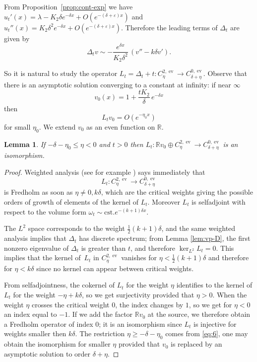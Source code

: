 \documentclass[10pt]{amsart}
\let\epsilon\varepsilon
\theoremstyle{plain}
\newtheorem{lem}[thm]{Lemma}
\theoremstyle{definition}
\DeclareMathOperator{\ev}{ev}
\begin{document}
From Proposition~\ref{prop:cont-exp} we have
$u_t'(x)=\lambda-K_2\delta e^{-\delta x}+O(e^{-(\delta+\epsilon)x})$ and
$u_t''(x)=K_2\delta^2e^{-\delta x}+O(e^{-(\delta+\epsilon)x})$. Therefore the leading terms of $\Delta_t$ are given by
\[ \Delta_tv \sim -\frac{e^{\delta x}}{K_2\delta^2}\, ( v'' - k\delta v'). \]

So it is natural to study the operator $L_t=\Delta_t+t:C^{2,\ev}_\eta\to C^{0,\ev}_{\delta+\eta}$. Observe that there is an asymptotic solution converging to a constant at infinity: if near $\infty$
\begin{equation}
v_0(x) = 1 + \frac{tK_2}{\delta}\, e^{-\delta x}
\end{equation}
then
\begin{equation}
L_tv_0=O(e^{-\eta_0 x})\label{eq:6}
\end{equation}
for small $\eta_0$.
We extend $v_0$ as an even function on $\mathbb{R}$.

\begin{lem}\label{lem:L-iso}
If $-\delta-\eta_0\leq\eta<0$ and $t>0$ then $L_t:\mathbb{R}v_0 \oplus C^{2,\ev}_\eta\to C^{0,\ev}_{\delta+\eta}$ is an isomorphism.
\end{lem}
\begin{proof}
Weighted analysis (see for example \cite{LocMcO}) says immediately that \[L_t:C^{2,\ev}_\eta\to C^{0,\ev}_{\delta+\eta}\] is Fredholm as soon as $\eta\neq0, k\delta$, which are the critical weights giving the possible orders of growth of elements of the kernel of $L_t$. Moreover $L_t$ is selfadjoint with respect to the volume form $\omega_t\sim \mathrm{cst.} e^{-(k+1)\delta x}$.

The $L^2$ space corresponds to the weight $\frac12 (k+1)\delta$, and the same weighted analysis implies that $\Delta_t$ has discrete spectrum; from Lemma \ref{lem:vp-D}, the first nonzero eigenvalue of $\Delta_t$ is greater than $t$, and therefore $\ker_{L^2}L_t=0$. This implies that the kernel of~$L_t$ in $C^{2,\ev}_\eta$ vanishes for $\eta<\frac12 (k+1)\delta$ and therefore for $\eta<k\delta$ since no kernel can appear between critical weights.

From selfadjointness, the cokernel of $L_t$ for the weight $\eta$ identifies to the kernel of $L_t$ for the weight $-\eta+k\delta$, so we get surjectivity provided that $\eta>0$. When the weight $\eta$ crosses the critical weight $0$, the index changes by $1$, so we get for $\eta<0$ an index equal to $-1$. If we add the factor $\mathbb{R}v_0$ at the source, we therefore obtain a Fredholm operator of index 0; it is an isomorphism since $L_t$ is injective for weights smaller then $k\delta$. The restriction $\eta\geq-\delta-\eta_0$ comes from \eqref{eq:6}, one may obtain the isomorphism for smaller $\eta$ provided that $v_0$ is replaced by an asymptotic solution to order $\delta+\eta$.
\end{proof}
\end{document}
